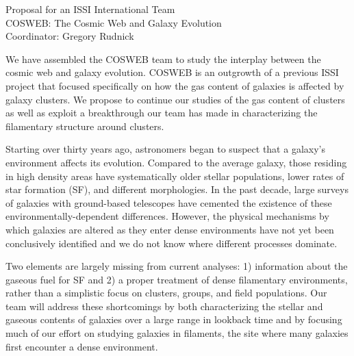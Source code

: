 \documentclass[11pt]{article}
\newcommand{\HRule}{\rule{\linewidth}{0.3mm}}
\begin{document}






\begin{center}
\large{Proposal for an ISSI International Team}\\
\Large{COSWEB: The Cosmic Web and Galaxy Evolution}\\
\medskip
\vspace{-0.2cm}
\large{Coordinator: Gregory Rudnick}\\
\end{center}
We have assembled the COSWEB team to study the interplay between the cosmic web and galaxy evolution. COSWEB is an outgrowth of a previous ISSI project that focused specifically on how the gas content of galaxies is affected by galaxy clusters. We propose to continue our studies of the gas content of clusters as well as exploit a breakthrough our team has made in characterizing the filamentary structure around clusters.

Starting over thirty years ago, astronomers began to suspect that a galaxy's environment affects its evolution.  Compared to the average galaxy, those residing in high density areas have systematically older stellar populations, lower rates of star formation (SF), and  different morphologies.  In the past decade, large surveys of galaxies with ground-based telescopes have cemented the existence of these environmentally-dependent differences. However, the physical mechanisms by which galaxies are altered as they enter dense environments have not yet been conclusively identified and we do not know where different processes dominate.

Two elements are largely missing from current analyses: 1) information about the gaseous fuel for SF and 2) a proper treatment of dense filamentary environments, rather than a simplistic focus on clusters, groups, and field populations. Our team will address these shortcomings by both characterizing the stellar and gaseous contents of galaxies over a large range in lookback time and by focusing much of our effort on studying galaxies in filaments, the site where many galaxies first encounter a dense environment.
\end{document}
